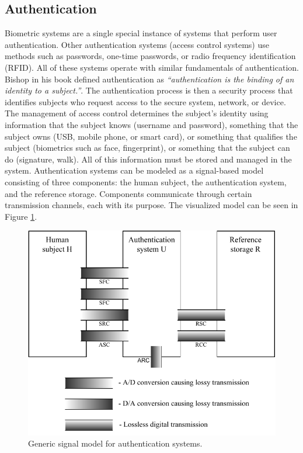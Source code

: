 \subsection{Authentication}
\label{Authentication}
Biometric systems are a single special instance of systems that perform user authentication. Other authentication systems (access control systems) use methods such as passwords, one-time passwords, or radio frequency identification (RFID). All of these systems operate with similar fundamentals of authentication. Bishop in his book\cite{ComputerSecurityBishop} defined authentication as \emph{``authentication is the binding of an identity to a subject.''}.
The authentication process is then a security process that identifies subjects who request access to the secure system, network, or device. The management of access control determines the subject's identity using information that the subject knows (username and password), something that the subject owns (USB, mobile phone, or smart card), or something that qualifies the subject (biometrics such as face, fingerprint), or something that the subject can do (signature, walk)\cite{BiometricAuthentication}. All of this information must be stored and managed in the system.
Authentication systems can be modeled as a signal-based model consisting of three components\cite{SecuritForBiometricData}: the human subject, the authentication system, and the reference storage. Components communicate through certain transmission channels, each with its purpose. The visualized model can be seen in Figure \ref{signalModel}.

\begin{figure}[ht]
	\centering
	\includegraphics[width=0.8\linewidth]{obrazky-figures/SignalAuthenticationModel.pdf}
	\caption{Generic signal model for authentication systems.}
	\label{signalModel}
\end{figure}

